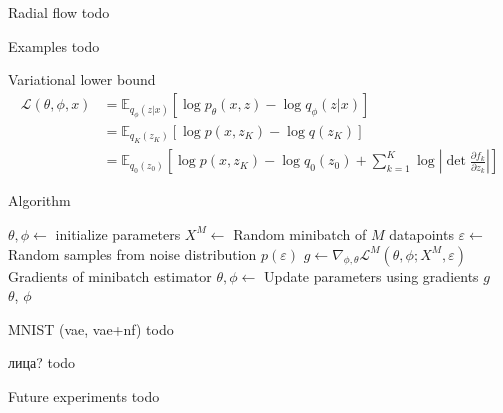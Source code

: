 \documentclass[unicode,11pt]{beamer}
\begin{document}
\begin{frame}[fragile]{Radial flow}
  todo
\end{frame}

\begin{frame}[fragile]{Examples}
  todo
\end{frame}

\begin{frame}[fragile]{Variational lower bound}
  \begin{align*} 
  \mathcal{L}(\theta, \phi, x) &= \mathbb{E}_{q_\phi(z|x)} \left[ \log p_\theta(x, z) - \log q_\phi(z | x) \right] \\
  &= \mathbb{E}_{q_K(z_K)} \left[ \log p(x, z_K) - \log q(z_K) \right] \\
  &= \mathbb{E}_{q_0(z_0)} \left[ \log p(x, z_K) - \log q_0(z_0) + \sum_{k=1}^K \log \left\vert \det 
  \frac{\partial f_k}  {\partial z_k} \right\vert \right] 
  \end{align*} 
\end{frame}

\begin{frame}[fragile]{Algorithm}
  \begin{algorithmic}
    \State $\theta, \phi \gets$ initialize parameters
    \Repeat 
       \State $X^M \gets$ Random minibatch of $M$ datapoints 
       \State $\varepsilon \gets$ Random samples from noise distribution $p(\varepsilon)$
       \State $g \gets \nabla_{\phi, \theta} \mathcal{L}^M(\theta, \phi; X^M, \varepsilon) $ Gradients of minibatch estimator
       \State $\theta, \phi \gets$ Update parameters using gradients $g$
    \\
    \Return $\theta$, $\phi$
  \end{algorithmic}
  
\end{frame}

\begin{frame}[fragile]{MNIST (vae, vae+nf)}
  todo
\end{frame}

\begin{frame}[fragile]{лица?}
  todo
\end{frame}

\begin{frame}[fragile]{Future experiments}
  todo 
\end{frame}
\end{document}
